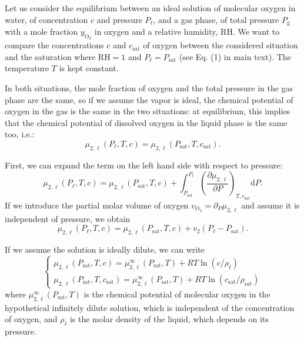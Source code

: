 \documentclass[aps,prl,twocolumn,superscriptaddress,groupedaddress]{revtex4}
\begin{document}
Let us consider the equilibrium between an ideal solution of molecular oxygen in water, of concentration $c$ and pressure $P_\ell$, and a gas phase, of total pressure $P_\text{g}$ with a mole fraction $y_\mathrm{O_2}$ in oxygen and a relative humidity, $\mathrm{RH}$. We want to compare the concentrations $c$ and $c_\text{sat}$ of oxygen between the considered situation and the saturation where $\mathrm{RH}=1$ and $P_\ell = P_\text{sat}$ (see Eq. (1) in main text). The temperature $T$ is kept constant.

In both situations, the mole fraction of oxygen and the total pressure in the gas phase are the same, so if we assume the vapor is ideal, the chemical potential of oxygen in the gas is the same in the two situations: at equilibrium, this implies that the chemical potential of dissolved oxygen in the liquid phase is the same too, i.e.:
\begin{equation}
\mu_{2,\ell} (P_\ell,T,c) = \mu_{2,\ell} (P_\text{sat},T,c_\text{sat}).
\label{eq:equilibrium_condition}
\end{equation}

First, we can expand the term on the left hand side with respect to pressure:
\begin{equation}
\mu_{2,\ell} (P_\ell,T,c) = \mu_{2,\ell} (P_\text{sat},T,c) + \int_{P_\text{sat}}^{P_\ell} \left(\frac{\partial \mu_{2,\ell}}{\partial P}\right)_{T,c_\text{sat}} \mathrm{d} P.
\end{equation}
\noindent If we introduce the partial molar volume of oxygen $v_\mathrm{O_2} =\partial_P \mu_{2,\ell}$ and assume it is independent of pressure, we obtain
\begin{equation}
\mu_{2,\ell} (P_\ell,T,c) = \mu_{2,\ell} (P_\text{sat},T,c) + v_2(P_\ell - P_\text{sat}).
\end{equation}

If we assume the solution is ideally dilute, we can write
\begin{equation}
\left\{ \begin{array}{l}
\mu_{2,\ell} (P_\text{sat},T,c) = \mu^\infty_{2,\ell} (P_\text{sat},T) + RT\ln{(c/\rho_\ell)} \\
\mu_{2,\ell} (P_\text{sat},T,c_\text{sat}) = \mu^\infty_{2,\ell} (P_\text{sat},T) + RT\ln{(c_\text{sat}/\rho_\text{sat})}
\end{array} \right.
\end{equation}
\noindent where $\mu^\infty_{2,\ell}(P_\text{sat},T)$ is the chemical potential of molecular oxygen in the hypothetical infinitely dilute solution, which is independent of the concentration of oxygen, and $\rho_\ell$ is the molar density of the liquid, which depends on its pressure.
\end{document}
